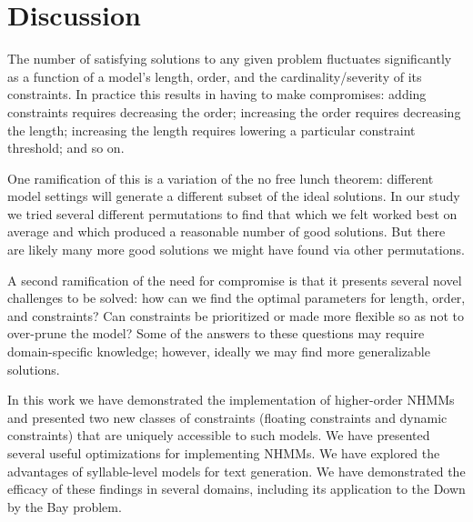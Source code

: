 \documentclass[phd,electronic,oneside,twosidetoc,letterpaper,chaptercenter,parttop,lol,lof,lot]{byumsphd}
\begin{document}


\section{Discussion}

The number of satisfying solutions to any given problem fluctuates significantly as a function of a model's length, order, and the cardinality/severity of its constraints. In practice this results in having to make compromises: adding constraints requires decreasing the order; increasing the order requires decreasing the length; increasing the length requires lowering a particular constraint threshold; and so on.

One ramification of this is a variation of the no free lunch theorem: different model settings will generate a different subset of the ideal solutions. In our study we tried several different permutations to find that which we felt worked best on average and which produced a reasonable number of good solutions. But there are likely many more good solutions we might have found via other permutations.

A second ramification of the need for compromise is that it presents several novel challenges to be solved: how can we find the optimal parameters for length, order, and constraints? Can constraints be prioritized or made more flexible so as not to over-prune the model? Some of the answers to these questions may require domain-specific knowledge; however, ideally we may find more generalizable solutions.

In this work we have demonstrated the implementation of higher-order NHMMs and presented two new classes of constraints (floating constraints and dynamic constraints) that are uniquely accessible to such models. We have presented several useful optimizations for implementing NHMMs. We have explored the advantages of syllable-level models for text generation. We have demonstrated the efficacy of these findings in several domains, including its application to the Down by the Bay problem.
\end{document}
